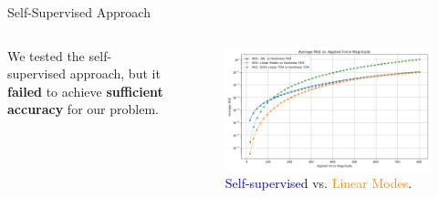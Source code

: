 \documentclass[9pt]{beamer}
\begin{document}
\begin{frame}{Self-Supervised Approach}
    \begin{columns}[T]
        \begin{column}{0.4\textwidth}
            \vspace{5em}
            We tested the self-supervised approach, but it \textbf{failed} to achieve \textbf{sufficient accuracy} for our {problem}.  
    
        \end{column}
        
        \begin{column}{0.6\textwidth}
            \begin{figure}
                \includegraphics[width=\textwidth]{Images/self_supervised_mse.png}
                                \caption{\textcolor{darkblue}{Self-supervised} vs. \textcolor{darkorange}{Linear Modes}.}
            \end{figure}
        \end{column}
    \end{columns}
\end{frame}
\end{document}
